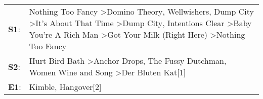\begin{supertabular}{p{0.03\textwidth}p{0.92\textwidth}}
 \textbf{S1}:  &  Nothing Too Fancy\textsuperscript{} \textgreater \enspace Domino Theory\textsuperscript{}, \enspace Wellwishers\textsuperscript{}, \enspace Dump City\textsuperscript{} \textgreater \enspace It's About That Time\textsuperscript{} \textgreater \enspace Dump City\textsuperscript{}, \enspace Intentions Clear\textsuperscript{} \textgreater \enspace Baby You're A Rich Man\textsuperscript{} \textgreater \enspace Got Your Milk (Right Here)\textsuperscript{} \textgreater \enspace Nothing Too Fancy\textsuperscript{}  \enspace  \\
 \textbf{S2}:  &                                                                                                                                                                                                                                                                                   Hurt Bird Bath\textsuperscript{} \textgreater \enspace Anchor Drops\textsuperscript{}, \enspace The Fussy Dutchman\textsuperscript{}, \enspace Women Wine and Song\textsuperscript{} \textgreater \enspace Der Bluten Kat[1]\textsuperscript{}  \enspace  \\
 \textbf{E1}:  &                                                                                                                                                                                                                                                                                                                                                                                                                                                                 Kimble\textsuperscript{}, \enspace Hangover[2]\textsuperscript{}  \enspace  \\
\end{supertabular}
